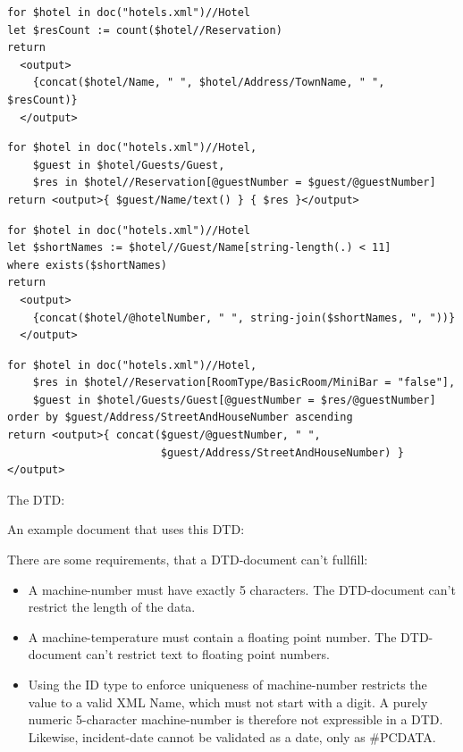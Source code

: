 \documentclass[12pt,ngerman]{scrartcl}
\begin{document}
\subexercise{}
{\footnotesize
\begin{lstlisting}
for $hotel in doc("hotels.xml")//Hotel
let $resCount := count($hotel//Reservation)
return 
  <output>
    {concat($hotel/Name, " ", $hotel/Address/TownName, " ", $resCount)}
  </output>
\end{lstlisting}

\subexercise{}
\begin{lstlisting}
for $hotel in doc("hotels.xml")//Hotel,
    $guest in $hotel/Guests/Guest,
    $res in $hotel//Reservation[@guestNumber = $guest/@guestNumber]
return <output>{ $guest/Name/text() } { $res }</output>
\end{lstlisting}

\subexercise{}
\begin{lstlisting}
for $hotel in doc("hotels.xml")//Hotel
let $shortNames := $hotel//Guest/Name[string-length(.) < 11]
where exists($shortNames)
return 
  <output>
    {concat($hotel/@hotelNumber, " ", string-join($shortNames, ", "))}
  </output>
\end{lstlisting}

\subexercise{}
\begin{lstlisting}
for $hotel in doc("hotels.xml")//Hotel,
    $res in $hotel//Reservation[RoomType/BasicRoom/MiniBar = "false"],
    $guest in $hotel/Guests/Guest[@guestNumber = $res/@guestNumber]
order by $guest/Address/StreetAndHouseNumber ascending
return <output>{ concat($guest/@guestNumber, " ",
                        $guest/Address/StreetAndHouseNumber) }</output>
\end{lstlisting}
}

\subexercise{}
The DTD:

An example document that uses this DTD:

There are some requirements, that a DTD-document can't fullfill:
\begin{itemize}
    \item A machine-number must have exactly 5 characters. The DTD-document can't restrict the length of the data.
    \item A machine-temperature must contain a floating point number. The DTD-document can't restrict text to floating point numbers.
    \item Using the ID type to enforce uniqueness of machine-number restricts the value to a valid XML Name, which must not start with a digit. A purely numeric 5-character machine-number is therefore not expressible in a DTD. Likewise, incident-date cannot be validated as a date, only as \#PCDATA.
\end{itemize}
\end{document}
